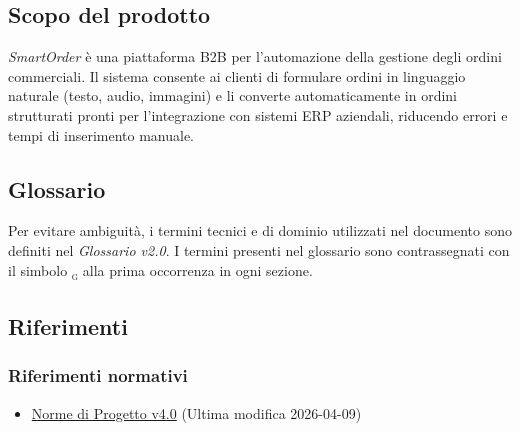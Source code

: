 \documentclass[a4paper, 11pt, oneside]{scrartcl}
\begin{document}
\subsection{Scopo del prodotto}
\textit{SmartOrder} \`e una piattaforma B2B per l'automazione della gestione degli ordini commerciali. Il sistema consente ai clienti di formulare ordini in linguaggio naturale (testo, audio, immagini) e li converte automaticamente in ordini strutturati pronti per l'integrazione con sistemi ERP aziendali, riducendo errori e tempi di inserimento manuale.

\subsection{Glossario}
Per evitare ambiguit\`a, i termini tecnici e di dominio utilizzati nel documento sono definiti nel \textit{Glossario v2.0}.
I termini presenti nel glossario sono contrassegnati con il simbolo \textsubscript{\textsc{g}} alla prima occorrenza in ogni sezione.

\subsection{Riferimenti}

\subsubsection{Riferimenti normativi}
\begin{itemize}
    \item \href{https://swenightpro.github.io/Documentazione/docs/PB/Documentazione%20Interna/Norme_Di_Progetto.pdf}{Norme di Progetto v4.0} (Ultima modifica 2026-04-09)
\end{itemize}
\end{document}
